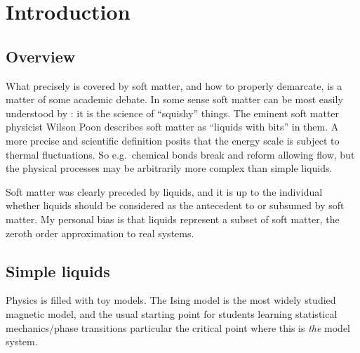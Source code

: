 \documentclass[11pt,twoside]{report}
\begin{document}
\chapter{Introduction}

\section{Overview}


What precisely is covered by soft matter, and how to properly demarcate, is a matter of some academic debate.
In some sense soft matter can be most easily understood by : it is the science of ``squishy'' things.
The eminent soft matter physicist Wilson Poon describes soft matter as ``liquids with bits'' in them.
A more precise and scientific definition posits that the energy scale is subject to thermal fluctuations.
So e.g.\ chemical bonds break and reform allowing flow, but the physical processes may be arbitrarily more complex than simple liquids.

Soft matter was clearly preceded by liquids, and it is up to the individual whether liquids should be considered as the antecedent to or subsumed by soft matter.
My personal bias is that liquids represent a subset of soft matter, the zeroth order approximation to real systems.

\section{Simple liquids}

Physics is filled with toy models.
The Ising model is the most widely studied magnetic model, and the usual starting point for students learning statistical mechanics/phase transitions particular the critical point where this is \emph{the} model system.
\end{document}
